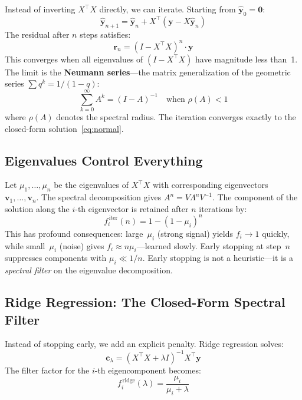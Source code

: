 \documentclass[11pt,a4paper]{article}
\begin{document}
Instead of inverting $X^\top X$ directly, we can iterate. Starting from $\hat{\mathbf{y}}_0 = \mathbf{0}$:
\begin{equation}
  \hat{\mathbf{y}}_{n+1} = \hat{\mathbf{y}}_n + X^\top(\mathbf{y} - X\hat{\mathbf{y}}_n)
\end{equation}
The residual after $n$ steps satisfies:
\begin{equation}\label{eq:residual}
  \mathbf{r}_n = (I - X^\top X)^n \cdot \mathbf{y}
\end{equation}
This converges when all eigenvalues of $(I - X^\top X)$ have magnitude less than~1. The limit is the \textbf{Neumann series}---the matrix generalization of the geometric series $\sum q^k = 1/(1-q)$:
\begin{equation}\label{eq:neumann}
  \sum_{k=0}^{\infty} A^k = (I - A)^{-1}
  \quad\text{when } \rho(A) < 1
\end{equation}
where $\rho(A)$ denotes the spectral radius. The iteration converges exactly to the closed-form solution~\eqref{eq:normal}.

\subsection{Eigenvalues Control Everything}

Let $\mu_1, \ldots, \mu_n$ be the eigenvalues of $X^\top X$ with corresponding eigenvectors $\mathbf{v}_1, \ldots, \mathbf{v}_n$. The spectral decomposition gives $A^n = V \Lambda^n V^{-1}$. The component of the solution along the $i$-th eigenvector is retained after $n$ iterations by:
\begin{equation}\label{eq:iter_filter}
  f_i^{\,\mathrm{iter}}(n) = 1 - (1 - \mu_i)^n
\end{equation}
This has profound consequences: large~$\mu_i$ (strong signal) yields $f_i \to 1$ quickly, while small~$\mu_i$ (noise) gives $f_i \approx n\mu_i$---learned slowly. Early stopping at step~$n$ suppresses components with $\mu_i \ll 1/n$. Early stopping is not a heuristic---it is a \emph{spectral filter} on the eigenvalue decomposition.

\subsection{Ridge Regression: The Closed-Form Spectral Filter}\label{sec:ridge}

Instead of stopping early, we add an explicit penalty. Ridge regression solves:
\begin{equation}\label{eq:ridge}
  \mathbf{c}_\lambda = (X^\top X + \lambda I)^{-1} X^\top \mathbf{y}
\end{equation}
The filter factor for the $i$-th eigencomponent becomes:
\begin{equation}\label{eq:ridge_filter}
  f_i^{\,\mathrm{ridge}}(\lambda) = \frac{\mu_i}{\mu_i + \lambda}
\end{equation}
\end{document}
